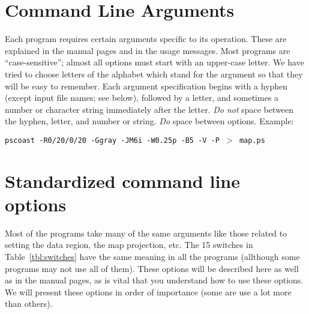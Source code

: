 

\section{Command Line Arguments} 
%
%

Each program requires certain arguments specific to its operation.
These are explained in the manual pages and in the usage messages.
Most programs are ``case-sensitive''; almost all options must start
with an upper-case letter.  We have tried to choose letters of the
alphabet which stand for the argument so that they will be easy to
remember.  Each argument specification begins with a hyphen
(except input file names; see below), followed by a letter, and
sometimes a number or character string immediately after the letter.
\emph{Do not} space between the hyphen, letter, and number or string.
\emph{Do} space between options.  Example:

\vspace{\baselineskip} 

\texttt{pscoast -R0/20/0/20 -Ggray -JM6i -W0.25p -B5 -V -P $>$ map.ps}

\section{Standardized command line options} 
%
%
\label{sec:stopt}

Most of the programs take many of the same arguments like those
related to setting the data region, the map projection, etc.
The 15 switches in Table~\ref{tbl:switches} have the same meaning
in all the programs (allthough some programs may not use all of them).
These options will be described here as well as in the manual pages,
as is vital that you understand how to use these options.  We will present
these options in order of importance (some are use a lot more than others).

